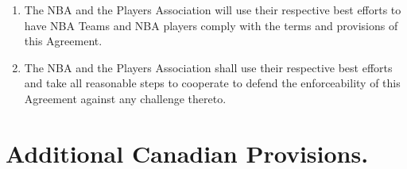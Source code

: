 \documentclass[
]{book}
\providecommand{\tightlist}{%
  \setlength{\itemsep}{0pt}\setlength{\parskip}{0pt}}
\begin{document}
\begin{enumerate}
\def\labelenumi{(\alph{enumi})}
\tightlist
\item
  The NBA and the Players Association will use their respective best efforts to have NBA Teams and NBA players comply with the terms and provisions of this Agreement.
\item
  The NBA and the Players Association shall use their respective best efforts and take all reasonable steps to cooperate to defend the enforceability of this Agreement against any challenge thereto.
\end{enumerate}

\hypertarget{additional-canadian-provisions.}{%
\section{Additional Canadian Provisions.}\label{additional-canadian-provisions.}}
\end{document}
